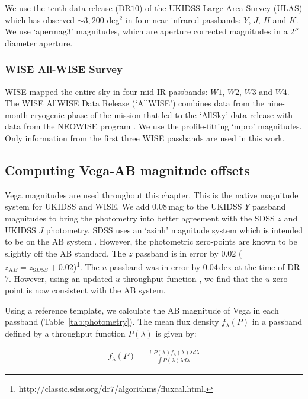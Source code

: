 We use the tenth data release (DR$10$) of the UKIDSS Large Area Survey (ULAS) which has observed $\sim 3,200$ deg$^2$ in four near-infrared passbands: $Y$, $J$, $H$ and $K$. 
We use `apermag$3$' magnitudes, which are aperture corrected magnitudes in a $2''$ diameter aperture.

\subsubsection{WISE All-WISE Survey}

WISE mapped the entire sky in four mid-IR passbands: $W1$, $W2$, $W3$ and $W4$. 
The WISE AllWISE Data Release (`AllWISE') combines data from the nine-month cryogenic phase of the mission that led to the `AllSky' data release with data from the NEOWISE program \citep{mainzer11}. 
We use the profile-fitting `mpro' magnitudes.   
Only information from the first three WISE passbands are used in this work.

\subsection{Computing Vega-AB magnitude offsets}

Vega magnitudes are used throughout this chapter. 
This is the native magnitude system for UKIDSS and WISE.
We add $0.08$\,mag to the UKIDSS $Y$ passband magnitudes to bring the photometry into better agreement with the SDSS $z$ and UKIDSS $J$ photometry. 
SDSS uses an `asinh' magnitude system \citep{lupton99} which is intended to be on the AB system \citep{oke83}.
However, the photometric zero-points are known to be slightly off the AB standard. 
The $z$ passband is in error by $0.02$ ($z_{\mathrm AB} = z_{\mathrm SDSS} + 0.02$)\footnote{http://classic.sdss.org/dr$7$/algorithms/fluxcal.html.}.
The $u$ passband was in error by $0.04$\,dex at the time of DR$7$. 
However, using an updated $u$ throughput function \citep{doi10}, we find that the $u$ zero-point is now consistent with the AB system. 

Using a reference template, we calculate the AB magnitude of Vega in each passband (Table~\ref{tab:photometry}). 
The mean flux density $f_\lambda(P)$ in a passband defined by a throughput function $P(\lambda)$ is given by: 

\begingroup\makeatletter{}\check@mathfonts
\begin{eqnarray}
\label{eq:flux}
  f_\lambda(P) = \frac {\int P(\lambda)f_\lambda(\lambda)\lambda d\lambda} {\int P(\lambda)\lambda d\lambda} 
\end{eqnarray}
\endgroup

